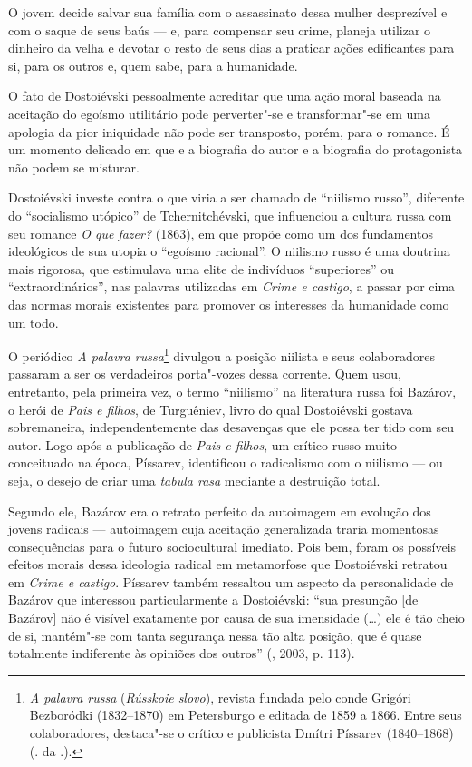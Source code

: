 O jovem decide salvar sua família com o assassinato dessa mulher
desprezível e com o saque de seus baús --- e, para compensar seu crime,
planeja utilizar o dinheiro da velha e devotar o resto de seus dias a
praticar ações edificantes para si, para os outros e, quem sabe, para a
humanidade.

O fato de Dostoiévski pessoalmente acreditar que uma ação moral baseada
na aceitação do egoísmo utilitário pode perverter"-se e transformar"-se em
uma apologia da pior iniquidade não pode ser transposto, porém, para o
romance. É um momento delicado em que e a biografia do autor e a
biografia do protagonista não podem se misturar.

Dostoiévski investe contra o que viria a ser chamado de ``niilismo
russo'', diferente do ``socialismo utópico'' de Tchernitchévski, que
influenciou a cultura russa com seu romance \emph{O que fazer?} (1863),
em que propõe como um dos fundamentos ideológicos de sua utopia o
``egoísmo racional''. O niilismo russo é uma doutrina mais rigorosa, que
estimulava uma elite de indivíduos ``superiores'' ou
``extraordinários'', nas palavras utilizadas em \emph{Crime e castigo},
a passar por cima das normas morais existentes para promover os
interesses da humanidade como um todo.

O periódico \emph{A palavra russa}\footnote{\emph{A palavra russa}
  (\emph{Rússkoie slovo}), revista fundada pelo conde Grigóri Bezboródki
  (1832--1870) em Petersburgo e editada de 1859 a 1866. Entre seus
  colaboradores, destaca"-se o crítico e publicista Dmítri Píssarev
  (1840--1868) (. da .).} divulgou a posição niilista e seus
colaboradores passaram a ser os verdadeiros porta"-vozes dessa corrente.
Quem usou, entretanto, pela primeira vez, o termo ``niilismo'' na
literatura russa foi Bazárov, o herói de \emph{Pais e filhos}, de
Turguêniev, livro do qual Dostoiévski gostava sobremaneira,
independentemente das desavenças que ele possa ter tido com seu autor.
Logo após a publicação de \emph{Pais e filhos}, um crítico russo muito
conceituado na época, Píssarev, identificou o radicalismo com o niilismo
--- ou seja, o desejo de criar uma \emph{tabula rasa} mediante a
destruição total.

Segundo ele, Bazárov era o retrato perfeito da autoimagem em evolução
dos jovens radicais --- autoimagem cuja aceitação generalizada traria
momentosas consequências para o futuro sociocultural imediato. Pois bem,
foram os possíveis efeitos morais dessa ideologia radical em metamorfose
que Dostoiévski retratou em \emph{Crime e castigo}. Píssarev também
ressaltou um aspecto da personalidade de Bazárov que interessou
particularmente a Dostoiévski: ``sua presunção [de Bazárov] não é
visível exatamente por causa de sua imensidade (\ldots{}) ele é tão cheio de
si, mantém"-se com tanta segurança nessa tão alta posição, que é quase
totalmente indiferente às opiniões dos outros'' (, 2003, p. 113).

